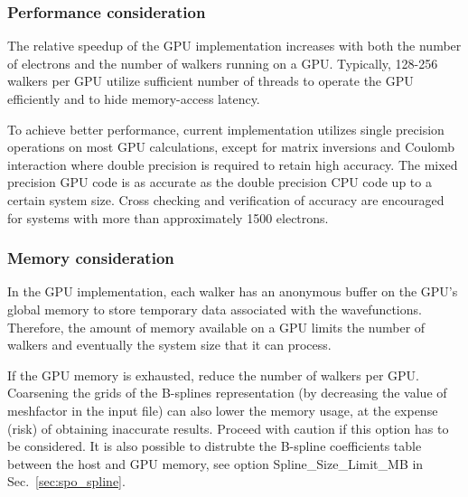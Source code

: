 
\subsubsection{Performance consideration}
\label{sec:gpu:performance}

The relative speedup of the GPU implementation increases with both the number of electrons and the number of walkers running on a GPU. Typically, 128-256 walkers per GPU utilize sufficient number of threads to operate the GPU efficiently and to hide memory-access latency.

To achieve better performance, current implementation utilizes single precision operations on most GPU calculations, except for matrix inversions and Coulomb interaction where double precision is required to retain high accuracy. The mixed precision GPU code is as accurate as the double precision CPU code up to a certain system size. Cross checking and verification of accuracy are encouraged for systems with more than approximately 1500 electrons.


\subsubsection{Memory consideration}

In the GPU implementation, each walker has an anonymous buffer on the GPU's global memory to store temporary data associated with the wavefunctions. Therefore, the amount of memory available on a GPU limits the number of walkers and eventually the system size that it can process.

If the GPU memory is exhausted, reduce the number of walkers per GPU.
Coarsening the grids of the B-splines representation (by decreasing the value of meshfactor in the input file) can also lower the memory usage,
at the expense (risk) of obtaining inaccurate results. Proceed with caution if this option has to be considered.
It is also possible to distrubte the B-spline coefficients table between the host and GPU memory, see option Spline\_Size\_Limit\_MB in Sec.~\ref{sec:spo_spline}.
